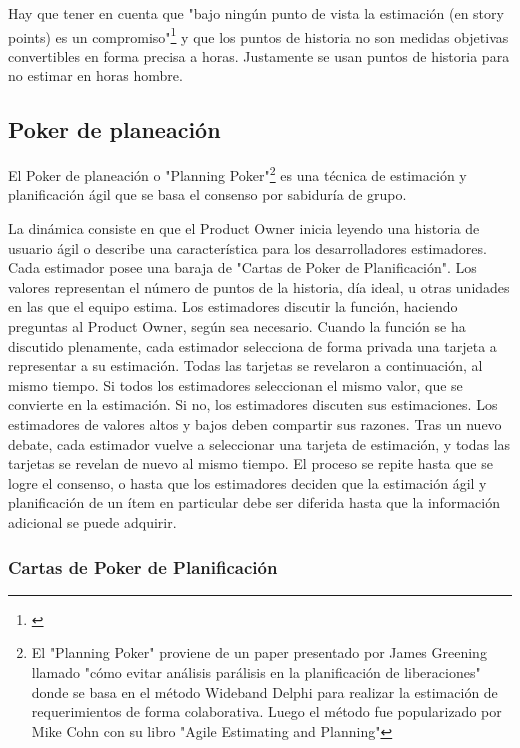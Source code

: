 Hay que tener en cuenta que "bajo ningún punto de vista la estimación (en story points) es un compromiso"\footnote{\cite{UNTREF-2014}} y que los puntos de historia no son medidas objetivas convertibles en forma precisa a horas. Justamente se usan puntos de historia para no estimar en horas hombre.

\subsection{Poker de planeación}

El Poker de planeación o "Planning Poker"\footnote{El "Planning Poker" proviene de un paper presentado por James Greening llamado "cómo evitar análisis parálisis en la planificación de liberaciones"\cite{James-Grenning-2002} donde se basa en el método Wideband Delphi para realizar la estimación de requerimientos de forma colaborativa. Luego el método fue popularizado por Mike Cohn con su libro "Agile Estimating and Planning"\cite{Cohn-2005}} es una técnica de estimación y planificación ágil que se basa el consenso por sabiduría de grupo. 

La dinámica consiste en que el Product Owner inicia leyendo una historia de usuario ágil o describe una característica para los desarrolladores estimadores. Cada estimador posee una baraja de "Cartas de Poker de Planificación". Los valores representan el número de puntos de la historia, día ideal, u otras unidades en las que el equipo estima. Los estimadores discutir la función, haciendo preguntas al Product Owner, según sea necesario. Cuando la función se ha discutido plenamente, cada estimador selecciona de forma privada una tarjeta a representar a su estimación. Todas las tarjetas se revelaron a continuación, al mismo tiempo. Si todos los estimadores seleccionan el mismo valor, que se convierte en la estimación. Si no, los estimadores discuten sus estimaciones. Los estimadores de valores altos y bajos deben compartir sus razones. Tras un nuevo debate, cada estimador vuelve a seleccionar una tarjeta de estimación, y todas las tarjetas se revelan de nuevo al mismo tiempo. El proceso se repite hasta que se logre el consenso, o hasta que los estimadores deciden que la estimación ágil y planificación de un ítem en particular debe ser diferida hasta que la información adicional se puede adquirir.


\subsubsection{Cartas de Poker de Planificación}

